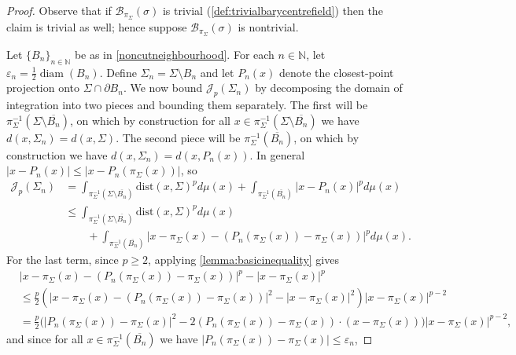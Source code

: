 \documentclass[preprint, reqno]{amsart}
\DeclareMathOperator*{\diam}{diam}
\renewcommand{\epsilon}{\varepsilon}
\newcommand{\dist}{\mathrm{dist}}
\theoremstyle{definition}
\numberwithin{equation}{section}
\begin{document}
\begin{proof}
  Observe that if $\mathcal{B}_{\pi_\Sigma}(\sigma)$ is trivial
  (\cref{def:trivialbarycentrefield}) then the claim is trivial as
  well; hence suppose $\mathcal{B}_{\pi_\Sigma}(\sigma)$ is
  nontrivial.

  Let $\{B_n\}_{n \in \mathbb{N}}$ be as in
  \cref{noncutneighbourhood}. For each $n \in \mathbb{N}$, let
  $\epsilon_n = \frac{1}{2}\diam(B_{n})$. Define $\Sigma_n = \Sigma
  \setminus B_n$ and let $P_n(x)$ denote the closest-point projection
  onto $\Sigma \cap \partial B_n$. We now bound $\mathscr
  J_p(\Sigma_n)$ by decomposing the domain of integration into two
  pieces and bounding them separately. The first will be
  $\pi_\Sigma^{-1}(\Sigma \setminus \overline{B_n})$, on which by
  construction for all $x \in \pi_\Sigma^{-1}(\Sigma \setminus
  \overline{B_n})$ we have $d(x, \Sigma_n) = d(x, \Sigma)$. The second
  piece will be $\pi_\Sigma^{-1}(\overline{B_n})$, on which by
  construction we have $d(x, \Sigma_n) = d(x, P_n(x))$. In general $|x
  - P_n(x)| \leq |x - P_n(\pi_\Sigma(x))|$, so
  \begin{align*}
    \mathscr{J}_p(\Sigma_n)
    & = \int_{\pi_{\Sigma}^{-1}(\Sigma \setminus
      \overline{B_n})}\dist(x, \Sigma)^p d\mu(x) +
      \int_{\pi_{\Sigma}^{-1}(\overline{B_n})}|x- P_n(x)|^p d\mu(x)\\
    &\leq \int_{\pi_{\Sigma}^{-1}(\Sigma \setminus
      \overline{B_n})}\dist(x, \Sigma)^p d\mu(x) \\
    & \qquad + \int_{\pi_{\Sigma}^{-1}(\overline{B_n})}|x-
      \pi_{\Sigma}(x) - (P_n(\pi_{\Sigma}(x)) - \pi_{\Sigma}(x))|^p
      d\mu(x).
  \end{align*}
  For the last term, since $p \ge 2$, applying
  \cref{lemma:basicinequality} gives
  \begin{align*}
    & |x - \pi_{\Sigma}(x)
      -(P_{n}(\pi_{\Sigma}(x)) - \pi_{\Sigma}(x))|^p - |x -
      \pi_{\Sigma}(x)|^p \\
    &\leq \frac{p}{2}( |x - \pi_{\Sigma}(x) -(P_{n}(\pi_{\Sigma}(x))
      - \pi_{\Sigma}(x))|^2 - |x - \pi_{\Sigma}(x)|^2
      )|x-\pi_{\Sigma}(x)|^{p-2} \\
    &= \frac{p}{2}\Big(
      |P_{n}(\pi_{\Sigma}(x)) - \pi_{\Sigma}(x)|^2
      - 2(P_{n}(\pi_{\Sigma}(x)) - \pi_{\Sigma}(x))\cdot
      (x - \pi_{\Sigma}(x)) \Big)|x - \pi_{\Sigma}(x)|^{p-2},
  \end{align*}
  and since for all $x \in \pi_\Sigma^{-1}( \overline{B_n})$ we have
  $|P_{n}(\pi_{\Sigma}(x)) - \pi_{\Sigma}(x)| \leq \epsilon_n$,

\end{proof}
\end{document}
